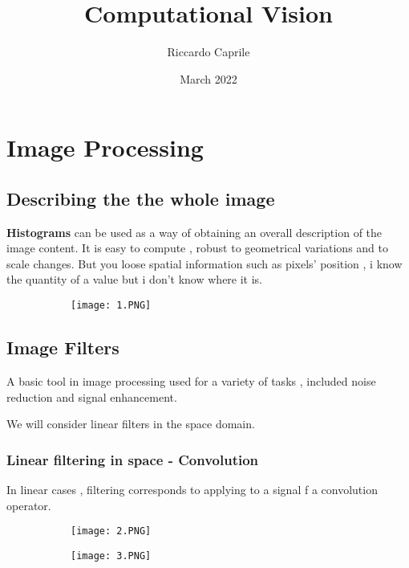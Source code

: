 \documentclass{article}
\title{Computational Vision}
\author{Riccardo Caprile}
\date{March 2022}
\begin{document}
\maketitle

\section{Image Processing}

\subsection{Describing the the whole image}

\textbf{Histograms} can be used as a way of obtaining an overall description of the image content. It is easy to compute , robust to geometrical variations and to scale changes.
But you loose spatial information such as pixels' position , i know the quantity of a value but i don't know where it is.

\begin{figure}[ht!]
  \centering
  \begin{subfigure}[b]{0.6\linewidth}
    \texttt{[image: 1.PNG]}
  \end{subfigure}
\end{figure}

\subsection{Image Filters}

A basic tool in image processing used for a variety of tasks , included noise reduction and signal enhancement.

We will consider linear filters in the space domain.


\vspace{30mm}

\subsubsection{Linear filtering in space - Convolution}

In linear cases , filtering corresponds to applying to a signal f a convolution operator.

\begin{figure}[ht!]
  \centering
  \begin{subfigure}[b]{0.5\linewidth}
    \texttt{[image: 2.PNG]}
  \end{subfigure}
     \begin{subfigure}[b]{0.49\textwidth}
         \centering
         \texttt{[image: 3.PNG]}
     \end{subfigure}
\end{figure}
\end{document}
